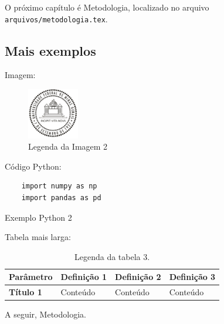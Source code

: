 \noindent O próximo capítulo é Metodologia, localizado no arquivo \texttt{arquivos/metodologia.tex}.


\subsection{Mais exemplos} 

Imagem:
\begin{figure}[h]
    \centering
\includegraphics[width=0.2\textwidth]{arquivos/pre-texto/Logo_UFMG.png}
    \caption{Legenda da Imagem 2}
    \label{fig2}
\end{figure}

Código Python:
\begin{listing}[h!]
    \centering
    \begin{verbatim}
    import numpy as np 
    import pandas as pd  
    \end{verbatim}
    \caption{Exemplo Python 2 }
    \label{lst:codigo-python2}
    \end{listing}

Tabela mais larga:
\begin{table}[h!]
    \centering
    \begin{tabularx}{\textwidth}{|l|X|X|X|}
        \hline
        \textbf{Parâmetro} & \textbf{Definição 1} & \textbf{Definição 2} & \textbf{Definição 3} \\ \hline
        \textbf{Título 1}  & Conteúdo & Conteúdo & Conteúdo \\ \hline
  
    \end{tabularx}
    \caption{Legenda da tabela 3.}
    \label{tab:nometabela3}
\end{table}




A seguir, Metodologia.

\newpage